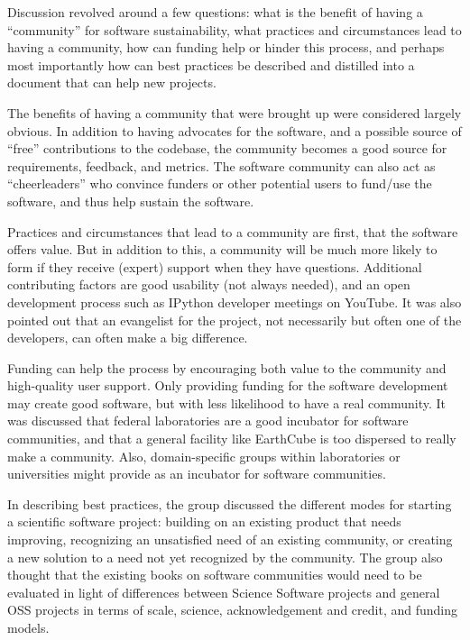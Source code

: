 Discussion revolved around a few questions: what is the benefit of having a ``community'' for software sustainability, what
practices and circumstances lead to having a community, how can funding help or hinder this process, and perhaps most
importantly how can best practices be described and distilled into a document that can help new projects.

The benefits of having a community that were brought up were considered largely obvious. In addition to having advocates for
the software, and a possible source of ``free'' contributions to the codebase, the community becomes a good source for
requirements, feedback, and metrics. The software community can also act as ``cheerleaders'' who convince funders or other
potential users to fund/use the software, and thus help sustain the software.

Practices and circumstances that lead to a community are first, that the software offers value. But in addition to this, a
community will be much more likely to form if they receive (expert) support when they have questions. Additional contributing
factors are good usability (not always needed), and an open development process such as IPython developer meetings on YouTube.
It was also pointed out that an evangelist for the project, not necessarily but often one of the developers, can often make a
big difference. 

Funding can help the process by encouraging both value to the community and high-quality user support. Only providing funding
for the software development may create good software, but with less likelihood to have a real community. It was discussed
that federal laboratories are a good incubator for software communities, and that a general facility like EarthCube is too
dispersed to really make a community. Also, domain-specific groups within laboratories or universities might provide as an
incubator for software communities.

In describing best practices, the group discussed the different modes for starting a scientific software project: building on
an existing product that needs improving, recognizing an unsatisfied need of an existing community, or creating a new solution
to a need not yet recognized by the community. The group also thought that the existing books on software communities would
need to be evaluated in light of differences between Science Software projects and general OSS projects in terms of scale,
science, acknowledgement and credit, and funding models.

